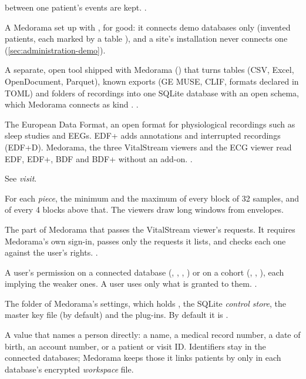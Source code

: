 \begin{description}
  between one patient's events are kept. .
\item[Demo installation] A Medorama set up with , for good: it
  connects demo databases only (invented patients, each marked by a table ),
  and a site's installation never connects one (\cref{sec:administration-demo}).
\item[db-builder] A separate, open tool shipped with Medorama () that turns
  tables (CSV, Excel, OpenDocument, Parquet), known exports (GE MUSE, CLIF, formats declared in
  TOML) and folders of recordings into one SQLite database with an open schema, which Medorama
  connects as kind . .
\item[EDF, EDF+] The European Data Format, an open format for physiological recordings such as
  sleep studies and EEGs. EDF+ adds annotations and interrupted recordings (EDF+D). Medorama, the
  three VitalStream viewers and the ECG viewer read EDF, EDF+, BDF and BDF+ without an add-on.
  .
\item[Encounter] See \textit{visit}.
\item[Envelope] For each \textit{piece}, the minimum and the maximum of every block of 32
  samples, and of every 4 blocks above that. The viewers draw long windows from envelopes.
\item[Gateway] The part of Medorama that passes the VitalStream viewer's requests. It requires
  Medorama's own sign-in, passes only the requests it lists, and checks each one against the
  user's rights. .
\item[Grant] A user's permission on a connected database (, ,
  , ) or on a cohort (, , ), each
  implying the weaker ones. A user uses only what is granted to them. .
\item[Home folder] The folder of Medorama's settings, which holds , the
  SQLite \textit{control store}, the master key file (by default) and the plug-ins. By default it
  is .
\item[Identifier] A value that names a person directly: a name, a medical record number, a date
  of birth, an account number, or a patient or visit ID. Identifiers stay in the connected
  databases; Medorama keeps those it links patients by only in each database's encrypted
  \textit{workspace} file.

\end{description}
